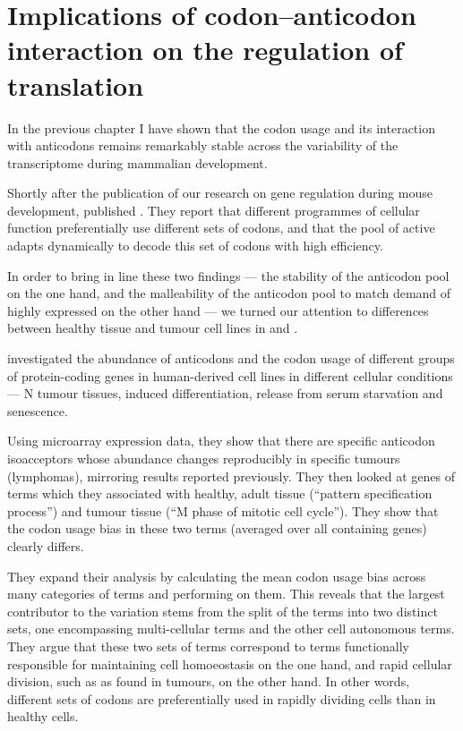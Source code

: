 \chapter{Implications of codon–anticodon interaction on the regulation of translation}


In the previous chapter I have shown that the codon usage and its interaction
with \trna anticodons remains remarkably stable across the variability of the
transcriptome during mammalian development.

Shortly after the publication of our research on \trna gene regulation during
mouse development, \citet{Gingold:2014} published . They
report that different programmes of cellular function preferentially use
different sets of codons, and that the pool of active \trna[s] adapts
dynamically to decode this set of codons with high efficiency.

In order to bring in line these two findings — the stability of the anticodon
pool on the one hand, and the malleability of the anticodon pool to match demand
of highly expressed on the other hand — we turned our attention to differences
between healthy tissue and tumour cell lines in \mmu and \hsa.


\citet{Gingold:2014} investigated the abundance of \trna anticodons and the
codon usage of different groups of protein-coding genes in human-derived cell
lines in different cellular conditions --- N tumour tissues,
induced differentiation, release from serum starvation and senescence.

Using microarray expression data, they show that there are specific anticodon
isoacceptors whose abundance changes reproducibly in specific tumours
(lymphomas), mirroring results reported previously.
They then looked at genes of \go terms which they associated with healthy, adult
tissue (“pattern specification process”) and tumour tissue (“M phase of mitotic
cell cycle”). They show that the codon usage bias in these two \go terms
(averaged over all containing genes) clearly differs.

They expand their analysis by calculating the mean codon usage bias across many
categories of \go terms and performing \pca on them. This reveals that the
largest contributor to the variation stems from the split of the \go terms into
two distinct sets, one encompassing multi-cellular \go terms and the other cell
autonomous \go terms. They argue that these two sets of \go terms correspond to
\go terms functionally responsible for maintaining cell homoeostasis on the one
hand, and rapid cellular division, such as as found in tumours, on the other
hand. In other words, different sets of codons are preferentially used in
rapidly dividing cells than in healthy cells.

